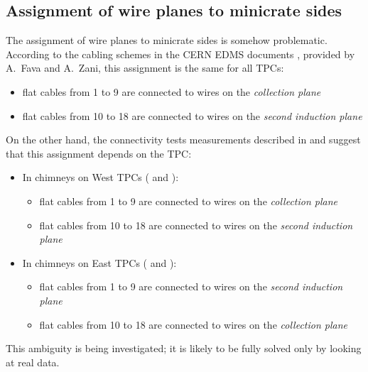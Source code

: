 \subsection{Assignment of wire planes to minicrate sides}
\label{ssec:PlaneAssignment}
The assignment of wire planes to minicrate sides is somehow problematic. According to the cabling schemes in the  CERN EDMS documents \cite{EDMS1531207v1}, provided by A.~Fava and A.~Zani, this assignment is the same for all TPCs:
\begin{itemize}
     \item flat cables from 1 to 9 are connected to wires on the \emph{collection plane}
      \item flat cables from 10 to 18 are connected to wires on the \emph{second induction plane}
\end{itemize}
On the other hand, the connectivity tests measurements described in \cite{SBNDocDBxxxx:ConnTest} and \cite{SBNDocDB14316} suggest that this assignment depends on the TPC:
\begin{itemize}
 \item In chimneys on West TPCs ( and ):
  \begin{itemize}
      \item flat cables from 1 to 9 are connected to wires on the \emph{collection plane}
       \item flat cables from 10 to 18 are connected to wires on the \emph{second induction plane}
  \end{itemize}
\item In chimneys on East TPCs ( and ):
  \begin{itemize}
      \item flat cables from 1 to 9 are connected to wires on the \emph{second induction plane}
       \item flat cables from 10 to 18 are connected to wires on the \emph{collection plane}
  \end{itemize}
\end{itemize}
This ambiguity is being investigated; it is likely to be fully solved only by looking at real data.


